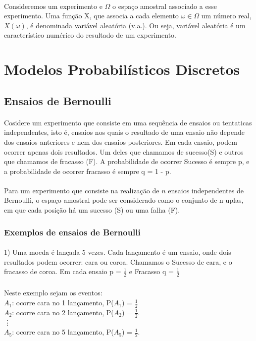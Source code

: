 \documentclass[10pt,a4paper]{article}
\begin{document}
\paragraph{}Consideremos um experimento e $ \Omega $ o espaço amostral associado a esse experimento. Uma função X, que associa a cada elemento $ \omega \in \Omega $ um número real, $ X(\omega) $, é denominada variável aleatória (v.a.). Ou seja, variável aleatória é um característico numérico do resultado de um experimento.

\section{Modelos Probabilísticos Discretos}
\subsection{Ensaios de Bernoulli}
\paragraph{}Cosidere um experimento que consiste em uma sequência de ensaios ou tentaticas independentes, isto é, ensaios nos quais o resultado de uma ensaio não depende dos ensaios anteriores e nem dos ensaios posteriores. Em cada ensaio, podem ocorrer apenas dois resultados. Um deles que chamamos de sucesso(S) e outros que chamamos de fracasso (F). A probabilidade de ocorrer Sucesso é sempre p, e a probabilidade de ocorrer fracasso é sempre q = 1 - p.
\paragraph{}Para um experimento que consiste na realização de $ n $ ensaios independentes de Bernoulli, o espaço amostral pode ser considerado como o conjunto de n-uplas, em que cada posição há um sucesso (S) ou uma falha (F).
\subsubsection{Exemplos de ensaios de Bernoulli}
\paragraph{}1) Uma moeda é lançada 5 vezes. Cada lançamento é um ensaio, onde dois resultados podem ocorrer: cara ou coroa. Chamamos o Sucesso de cara, e o fracasso de coroa. Em cada ensaio p = $\frac{1}{2}$ e Fracasso q = $\frac{1}{2}$
\subparagraph{}Neste exemplo sejam os eventos:\\
$A_{1}$: ocorre cara no 1 lançamento, P($A_{1}$) = $\frac{1}{2}$\\
$A_{2}$: ocorre cara no 2 lançamento, P($A_{2}$) = $\frac{1}{2}$.\\
\vdots\\
$A_{5}$: ocorre cara no 5 lançamento, P($A_{5}$) = $\frac{1}{2}$.\\
\end{document}
